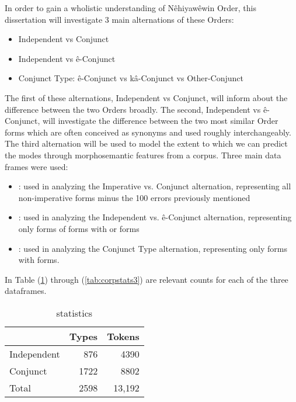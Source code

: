 In order to gain a wholistic understanding of Nêhiyawêwin Order, this dissertation will investigate 3 main alternations of these Orders:

\begin{itemize}
    \item Independent vs Conjunct
    \item Independent vs ê-Conjunct
    \item Conjunct Type: ê-Conjunct vs kâ-Conjunct vs Other-Conjunct
\end{itemize}

The first of these alternations, Independent vs Conjunct, will inform about the difference between the two Orders broadly. The second, Independent vs ê-Conjunct, will investigate the difference between the two most similar Order forms which are often conceived as synonyms and used roughly interchangeably. The third alternation will be used to model the extent to which we can predict the modes through morphosemantic features from a corpus. Three main data frames were used:

\begin{itemize}
    \item {}: used in analyzing the Imperative vs. Conjunct alternation, representing all non-imperative forms minus the 100 errors previously mentioned
    \item {}: used in analyzing the Independent vs. ê-Conjunct alternation, representing only forms of forms with   or  forms
    \item {}: used in analyzing the Conjunct Type alternation, representing only forms with   forms. 
\end{itemize}

In Table (\ref{tab:corpstats}) through (\ref{tab:corpstats3}) are relevant counts for each of the three dataframes.

\begin{table}
\centering
\begin{tabular}{lrr} \\
\toprule
               & Types & Tokens \\
\midrule
Independent    &  876  & 4390   \\
Conjunct     & 1722  & 8802   \\
\midrule
Total &  2598  & 13,192   \\
\bottomrule
\end{tabular}
\caption{ statistics \label{tab:corpstats}
}
\end{table}


